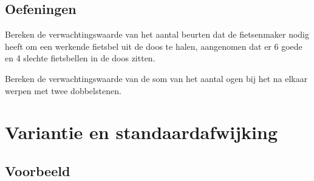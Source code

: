 \documentclass[a4paper,12pt, twoside]{article}
\begin{document}
\subsection{Oefeningen}

\begin{oefening}
Bereken de verwachtingswaarde van het aantal beurten dat de fietsenmaker nodig heeft om een werkende fietsbel uit de doos te halen, aangenomen dat er 6 goede en 4 slechte fietsbellen in de doos zitten.
\end{oefening}

\begin{oefening}
Bereken de verwachtingswaarde van de som van het aantal ogen bij het na elkaar werpen met twee dobbelstenen.
\end{oefening}

\cleardoublepage
\section{Variantie en standaardafwijking}

\subsection{Voorbeeld}
\end{document}
